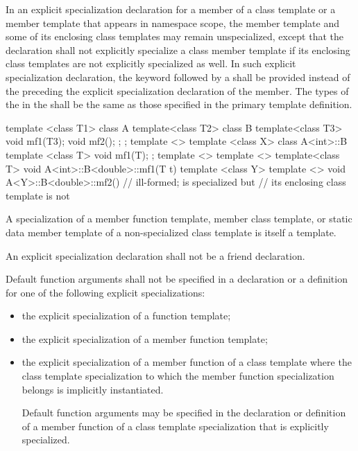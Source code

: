 \pnum
In an explicit specialization declaration for a member of a class template or
a member template that appears in namespace scope,
the member template and some of its enclosing class templates may remain
unspecialized,
except that the declaration shall not explicitly specialize a class member
template if its enclosing class templates are not explicitly specialized
as well.
In such explicit specialization declaration, the keyword
followed by a
shall be provided instead of the
preceding the explicit specialization declaration of the member.
The types of the
in the
shall be the same as those specified in the primary template definition.
\begin{example}

\begin{codeblock}
template <class T1> class A {
  template<class T2> class B {
    template<class T3> void mf1(T3);
    void mf2();
  };
};
template <> template <class X>
  class A<int>::B {
      template <class T> void mf1(T);
  };
template <> template <> template<class T>
  void A<int>::B<double>::mf1(T t) { }
template <class Y> template <>
  void A<Y>::B<double>::mf2() { }       // ill-formed;  is specialized but
                                        // its enclosing class template  is not
\end{codeblock}
\end{example}

\pnum
A specialization of a member function template, member class template,
or static data member template of
a non-specialized class template is itself a template.

\pnum
An explicit specialization declaration shall not be a friend declaration.

\pnum
Default function arguments shall not be specified in a declaration or
a definition for one of the following explicit specializations:

\begin{itemize}
\item
the explicit specialization of a function template;
\item
the explicit specialization of a member function template;
\item
the explicit specialization of a member function of a class template where
the class template specialization to which the member function specialization
belongs is implicitly instantiated.
\begin{note}
Default function arguments may be specified in the declaration or
definition of a member function of a class template specialization that is
explicitly specialized.
\end{note}
\end{itemize}

